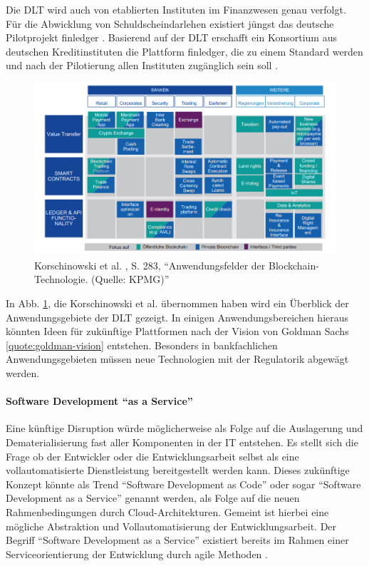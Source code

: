 Die \ac{DLT} wird auch von etablierten Instituten im Finanzwesen genau verfolgt.
Für die Abwicklung von Schuldscheindarlehen existiert jüngst das deutsche Pilotprojekt finledger \cite{finledger}. 
Basierend auf der \ac{DLT} erschafft ein Konsortium aus deutschen Kreditinstituten die Plattform finledger, die zu einem Standard werden und nach der Pilotierung allen Instituten zugänglich sein soll \cite{finledger}.

\begin{figure}[htbp]
 \centering
 \includegraphics[width=1.0\textwidth]{gfx/blockchainanwendung.PNG}
 \caption{Korschinowski et al. \cite{Korschinowski2018}, S. 283, \enquote{Anwendungsfelder der Blockchain-Technologie. (Quelle: KPMG)}\label{fig:blockchain}}
\end{figure}

In Abb. \ref{fig:blockchain}, die Korschinowski et al. \cite{Korschinowski2018} übernommen haben wird ein Überblick der Anwendungsgebiete der \ac{DLT} gezeigt. In einigen Anwendungsbereichen hieraus könnten Ideen für zukünftige Plattformen nach der Vision von Goldman Sachs \ref{quote:goldman-vision} entstehen. Besonders in bankfachlichen Anwendungsgebieten müssen neue Technologien mit der Regulatorik abgewägt werden.

\paragraph{Software Development \enquote{as a Service}}
Eine künftige Disruption würde möglicherweise als Folge auf die Auslagerung und Dematerialisierung fast aller Komponenten in der IT entstehen.
Es stellt sich die Frage ob der Entwickler oder die Entwicklungsarbeit selbst als eine vollautomatisierte Dienstleistung bereitgestellt werden kann. Dieses zukünftige Konzept könnte als Trend \enquote{Software Development as Code} oder sogar \enquote{Software Development as a Service} genannt werden, als Folge auf die neuen Rahmenbedingungen durch Cloud-Architekturen. Gemeint ist hierbei eine mögliche Abstraktion und Vollautomatisierung der Entwicklungsarbeit.
Der Begriff \enquote{Software Development as a Service} existiert bereits im Rahmen einer Serviceorientierung der Entwicklung durch agile Methoden \cite{Lehman:2011}.

